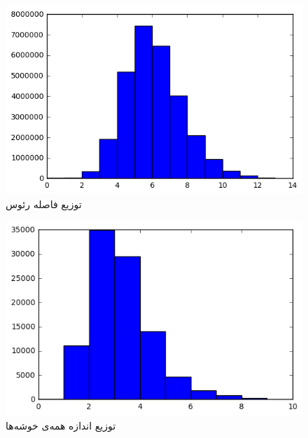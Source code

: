 \documentclass[11pt]{article}
\begin{document}
\begin{figure}[!h]
\caption{توزیع فاصله رئوس}
\centering
\includegraphics[height=0.4\textheight]{path-length}
\end{figure}
\begin{figure}[!h]
\caption{توزیع اندازه همه‌ی خوشه‌ها}
\centering
\includegraphics[height=0.4\textheight]{clique_count}
\end{figure}
\end{document}
